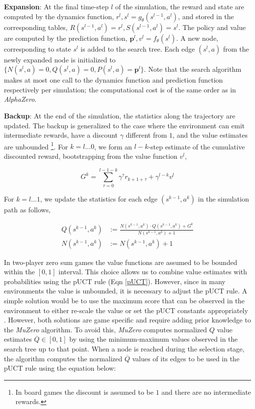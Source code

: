 \documentclass{article}
\newcommand{\muzero}{\emph{MuZero}}
\newcommand{\alphazero}{\emph{AlphaZero}}
\begin{document}
\begin{appendices}
{\bf Expansion}: At the final time-step $l$ of the simulation, the reward
and state are computed by the dynamics function, $r^l, s^l = g_\theta(s^{l-1}, a^{l})$,
and stored in the corresponding tables, $R(s^{l-1}, a^{l}) = r^l, S(s^{l-1}, a^{l}) = s^l$.
The policy and value are computed by the prediction function, $\mathbf{p}^l, v^l = f_\theta(s^l)$.
A new node, corresponding to state $s^l$ is added to the search tree.
Each edge $(s^l, a)$ from the newly expanded node is initialized to
$\{ N(s^l, a)=0, Q(s^l, a)=0, P(s^l, a)=\mathbf{p}^l \}$.
Note that the search algorithm makes at most one call to the dynamics function and prediction function respectively per simulation; the computational cost is of the same order as in \alphazero{}.

{\bf Backup}: At the end of the simulation, the statistics along the trajectory are updated.
The backup is generalized to the case where the environment can emit intermediate rewards, have a discount $\gamma$ different from $1$,
and the value estimates are unbounded \footnote{In board games the discount is assumed to be $1$ and there are no intermediate rewards.}.
For $k= l ... 0$, we form an $l-k$-step estimate of the cumulative discounted reward, bootstrapping
from the value function $v^l$,

\begin{equation}
G^k = \sum_{\tau=0}^{l-1-k}{\gamma ^ \tau r_{k+ 1 +\tau}} + \gamma^{l - k} v^l
\end{equation}

For $k= l ... 1$, we update the statistics for each edge $(s^{k-1}, a^{k})$ in the simulation path as follows,

\begin{equation}
\begin{aligned}
Q(s^{k-1},a^k) & := \frac{N(s^{k-1},a^k) \cdot Q(s^{k-1},a^k) + G^k}{N(s^{k-1},a^k) + 1} \\
N(s^{k-1},a^k) & := N(s^{k-1},a^k) + 1
\end{aligned}
\end{equation}

In two-player zero sum games the value functions are assumed to be bounded within the $[0, 1]$ interval. This choice allows us to
combine value estimates with probabilities using the pUCT rule (Eqn \ref{pUCT}).
However, since in many environments the value is unbounded, it is necessary
to adjust the pUCT rule. A simple solution would be to use the maximum score
that can be observed in the environment to either re-scale the value or set the
pUCT constants appropriately \cite{MCTS_single_agent}. However, both solutions are
game specific and require adding prior knowledge to the \muzero{} algorithm. To avoid this, \muzero{} computes normalized $Q$ value estimates $\overline{Q} \in [0, 1]$
by using the minimum-maximum values observed in the search tree up to that point.
When a node is reached during the selection stage, the algorithm computes the normalized $\overline{Q}$ values of its edges to be used in the pUCT rule using the equation below:


\end{appendices}
\end{document}
